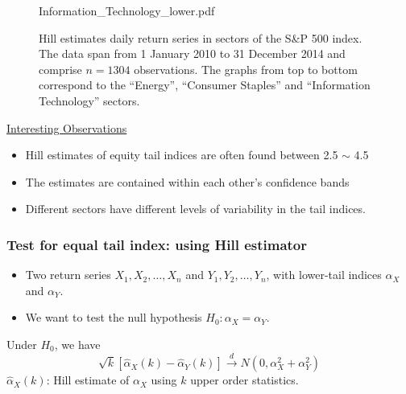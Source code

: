 \documentclass{beamer}
\begin{document}
\begin{frame}
\begin{minipage}[t]{0.5\linewidth}
\begin{figure}[htb!]
\begin{minipage}{1.0\linewidth}
                        {Information_Technology_lower.pdf}
      \end{minipage}
      \caption{\tiny Hill estimates daily return series in
        sectors of the S\&P 500 index. The data span  from 1 January
        2010 to 31 December 2014 and comprise $n=1304$ observations.
        The graphs from top to bottom correspond to the ``Energy'',
        ``Consumer Staples'' and ``Information Technology'' sectors.
      }\label{fig:1}
    \end{figure}
  \end{minipage}\hfill
  \begin{minipage}[t]{0.5\linewidth}
    \underline{Interesting Observations}
    \begin{itemize}
      \item Hill estimates of equity tail indices are often found
        between 2.5 $\sim$ 4.5
      \item The estimates are contained within each other's confidence bands
      \item Different sectors have different levels of variability in
        the tail indices.
    \end{itemize}
  \end{minipage}
\end{frame}

\begin{frame}
  \frametitle{Test for equal tail index: using Hill estimator}
  \begin{itemize}
    \item   Two return series $X_1, X_2, \dots, X_n$ and
      $Y_1, Y_2, \dots, Y_n$, with lower-tail indices
      $\alpha_X$ and $\alpha_Y$.
    \item We want to test the null hypothesis $H_0: \alpha_X = \alpha_Y$.
  \end{itemize}
  Under $H_0$, we have
  \[
  \sqrt k [\hat \alpha_X(k) - \hat \alpha_Y(k)] \overset{d}{\to}
  N(0, \alpha_X^2 + \alpha_Y^2)
  \]
  $\hat \alpha_X(k)$: Hill estimate of $\alpha_X$ using $k$ upper
  order statistics.
\end{frame}
\end{document}
